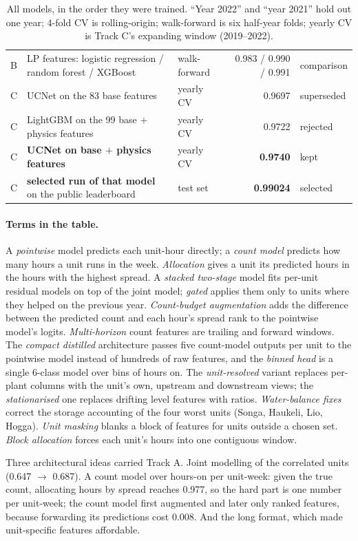 \documentclass[11pt]{article}
\newcommand{\kagglenn}{0.99024}                        %
\begin{document}
\begin{table}[H]
\begin{tabularx}{\linewidth}{lYlrl}
B & LP features: logistic regression / random forest / XGBoost & walk-forward & 0.983 / 0.990 / 0.991 & comparison \\
C & UCNet on the 83 base features & yearly CV & 0.9697 & superseded \\
C & LightGBM on the 99 base $+$ physics features & yearly CV & 0.9722 & rejected \\
C & \textbf{UCNet on base $+$ physics features} & yearly CV & \textbf{0.9740} & kept \\
C & \textbf{selected run of that model} on the public leaderboard & test set & \textbf{\kagglenn{}} & selected \\
\bottomrule
\end{tabularx}
\caption{All models, in the order they were trained. ``Year 2022'' and ``year 2021'' hold out one year; 4-fold CV
is rolling-origin; walk-forward is six half-year folds; yearly CV is Track C's expanding window
(2019--2022).}
\label{tab:r-all}
\end{table}

\paragraph{Terms in the table.} A \emph{pointwise} model predicts each unit-hour directly; a
\emph{count model} predicts how many hours a unit runs in the week. \emph{Allocation} gives a unit its
predicted hours in the hours with the highest spread. A \emph{stacked two-stage} model fits per-unit
residual models on top of the joint model; \emph{gated} applies them only to units where they helped
on the previous year. \emph{Count-budget augmentation} adds the difference between the predicted count
and each hour's spread rank to the pointwise model's logits. \emph{Multi-horizon} count features are
trailing and forward windows. The \emph{compact distilled} architecture passes five count-model
outputs per unit to the pointwise model instead of hundreds of raw features, and the \emph{binned head}
is a single 6-class model over bins of hours on. The \emph{unit-resolved} variant replaces per-plant
columns with the unit's own, upstream and downstream views; the \emph{stationarised} one replaces
drifting level features with ratios. \emph{Water-balance fixes} correct the storage accounting of the
four worst units (Songa, Haukeli, Lio, Hogga). \emph{Unit masking} blanks a block of features for units
outside a chosen set. \emph{Block allocation} forces each unit's hours into one contiguous window.

Three architectural ideas carried Track A. Joint modelling of the correlated units (0.647 $\to$
0.687). A count model over hours-on per unit-week: given the true count, allocating hours by spread
reaches 0.977, so the hard part is one number per unit-week; the count model first augmented and
later only ranked features, because forwarding its predictions cost 0.008. And the long
format, which made unit-specific features affordable.
\end{document}
